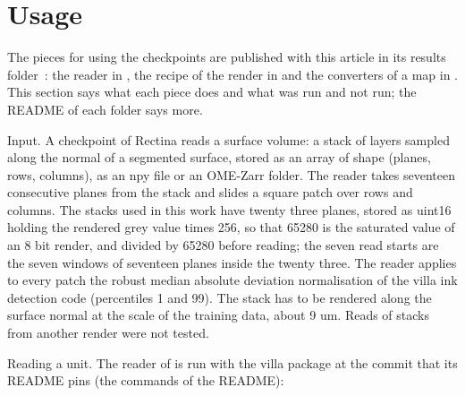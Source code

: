 \section{Usage}\label{sec:usage}

The pieces for using the checkpoints are published with this article in its results folder~\cite{ownfolder}: the reader in \UsageDirRead{}, the recipe of the render in \UsageDirRender{} and the converters of a map in \UsageDirConvert{}. This section says what each piece does and what was run and not run; the README of each folder says more.

Input. A checkpoint of Rectina reads a surface volume: a stack of layers sampled along the normal of a segmented surface, stored as an array of shape (planes, rows, columns), as an npy file or an OME-Zarr folder. The reader takes seventeen consecutive planes from the stack and slides a square patch over rows and columns. The stacks used in this work have twenty three planes, stored as uint16 holding the rendered grey value times 256, so that 65280 is the saturated value of an 8 bit render, and divided by 65280 before reading; the seven read starts are the seven windows of seventeen planes inside the twenty three. The reader applies to every patch the robust median absolute deviation normalisation of the villa ink detection code (percentiles 1 and 99). The stack has to be rendered along the surface normal at the scale of the training data, about 9 um. Reads of stacks from another render were not tested.

Reading a unit. The reader of \UsageDirRead{} is run with the villa package at the commit that its README pins (the commands of the README):






